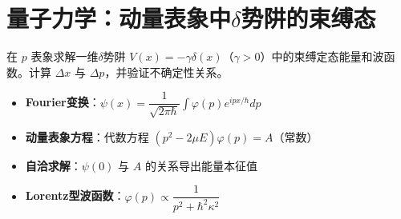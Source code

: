 \section{量子力学：动量表象中$\delta$势阱的束缚态}
\label{sec:momentum-delta-well}

\begin{modelbox}
在 $p$ 表象求解一维$\delta$势阱 $V(x)=-\gamma\delta(x)$（$\gamma>0$）中的束缚定态能量和波函数。计算 $\Delta x$ 与 $\Delta p$，并验证不确定性关系。
\end{modelbox}

\begin{tipbox}[考点快速分析]
\begin{itemize}
    \item \textbf{Fourier变换}：$\psi(x)=\dfrac{1}{\sqrt{2\pi\hbar}}\int\varphi(p)e^{ipx/\hbar}dp$
    \item \textbf{动量表象方程}：代数方程 $(p^2-2\mu E)\varphi(p)=A$（常数）
    \item \textbf{自洽求解}：$\psi(0)$ 与 $A$ 的关系导出能量本征值
    \item \textbf{Lorentz型波函数}：$\varphi(p)\propto\dfrac{1}{p^2+\hbar^2\kappa^2}$
\end{itemize}
\end{tipbox}

